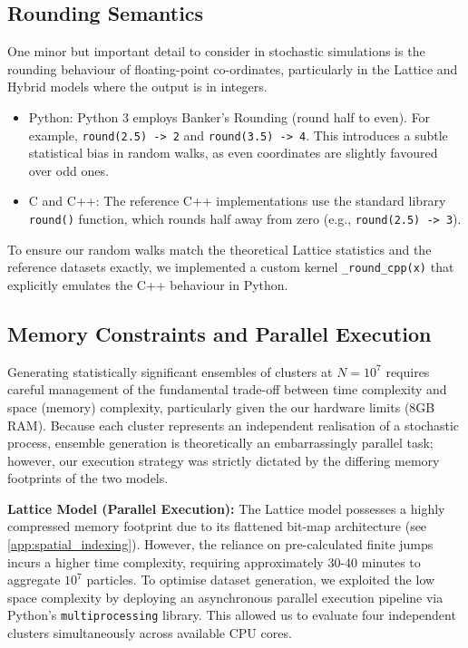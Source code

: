 \documentclass[12pt, a4paper, oneside]{report}
\theoremstyle{remark}
\begin{document}
\subsection{Rounding Semantics}
One minor but important detail to consider in stochastic simulations is the rounding behaviour of floating-point co-ordinates, particularly in the Lattice and Hybrid models where the output is in integers.
\begin{itemize}
    \item Python: Python 3 employs Banker's Rounding (round half to even). For example, \texttt{round(2.5) -> 2} and \texttt{round(3.5) -> 4}. This introduces a subtle statistical bias in random walks, as even coordinates are slightly favoured over odd ones.
    \item C and C++: The reference C++ implementations use the standard library \texttt{round()} function, which rounds half away from zero (e.g., \texttt{round(2.5) -> 3}).
\end{itemize}
To ensure our random walks match the theoretical Lattice statistics and the reference datasets exactly, we implemented a custom kernel \texttt{\_round\_cpp(x)} that explicitly emulates the C++ behaviour in Python.
\subsection{Memory Constraints and Parallel Execution}
Generating statistically significant ensembles of clusters at $N=10^7$ requires careful management of the fundamental trade-off between time complexity and space (memory) complexity, particularly given the our hardware limits (8GB RAM). Because each cluster represents an independent realisation of a stochastic process, ensemble generation is theoretically an embarrassingly parallel task; however, our execution strategy was strictly dictated by the differing memory footprints of the two models.

\noindent \textbf{Lattice Model (Parallel Execution):}
The Lattice model possesses a highly compressed memory footprint due to its flattened bit-map architecture (see \cref{app:spatial_indexing}). However, the reliance on pre-calculated finite jumps incurs a higher time complexity, requiring approximately 30-40 minutes to aggregate $10^7$ particles. To optimise dataset generation, we exploited the low space complexity by deploying an asynchronous parallel execution pipeline via Python's \texttt{multiprocessing} library. This allowed us to evaluate four independent clusters simultaneously across available CPU cores.
\end{document}
